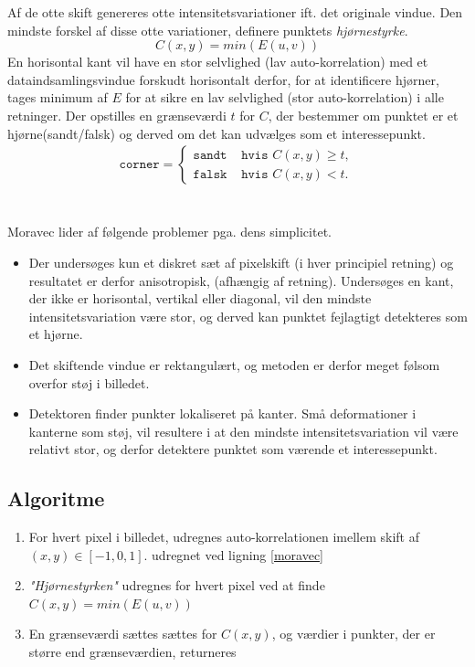 Af de otte skift genereres otte intensitetsvariationer ift. det originale vindue. Den mindste forskel af disse otte variationer, definere punktets \textit{hjørnestyrke}.
$$
C(x,y)=min(E(u,v))
$$
En horisontal kant vil have en stor selvlighed (lav auto-korrelation) med et dataindsamlingsvindue forskudt horisontalt derfor, for at identificere hjørner, tages minimum af $E$ for at sikre en lav selvlighed (stor auto-korrelation) i alle retninger. 
Der opstilles en grænseværdi $t$ for $C$, der bestemmer om punktet er et hjørne(sandt/falsk) og derved om det kan udvælges som et interessepunkt.
\begin{equation}
\begin{split}
\texttt{corner} = 
\begin{cases}
\texttt{sandt}& \texttt{hvis } C(x,y)\geq t, \\
\texttt{falsk }& \texttt{hvis } C(x,y) < t.
\end{cases}
\end{split}
\label{cornerind}
\end{equation}
 \\ \\
Moravec lider af følgende problemer pga. dens simplicitet. 
\begin{itemize}
\item{Der undersøges kun et diskret sæt af pixelskift (i hver principiel retning) og resultatet er derfor anisotropisk, (afhængig af retning). Undersøges en kant, der ikke er horisontal, vertikal eller diagonal, vil den mindste intensitetsvariation være stor, og derved kan punktet fejlagtigt detekteres som et hjørne.}
\item{Det skiftende vindue er rektangulært, og metoden er derfor meget følsom overfor støj i billedet.}
\item{Detektoren finder punkter lokaliseret på kanter. Små deformationer i kanterne som støj, vil resultere i at den mindste intensitetsvariation vil være relativt stor, og derfor detektere punktet som værende et interessepunkt.}
\end{itemize}
\subsection{Algoritme}
\begin{enumerate}
\item{For hvert pixel i billedet, udregnes auto-korrelationen imellem skift af $(x,y) \in [-1,0,1]$. udregnet ved ligning \ref{moravec}}
\item{\textit{"Hjørnestyrken"} udregnes for hvert pixel ved at finde $C(x,y)=min(E(u,v))$}
\item{En grænseværdi sættes sættes for $C(x,y)$, og værdier i punkter, der er større end grænseværdien, returneres}
\end{enumerate}

